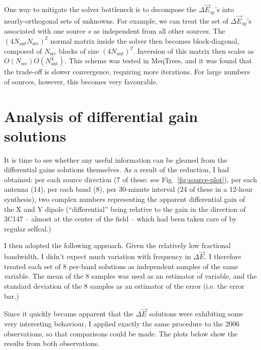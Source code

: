 \documentclass[]{aa}
\newcommand{\jones}[2]{\vec {#1}_{#2}}
\begin{document}
One way to mitigate the solver bottleneck is to decompose the $\Delta\jones{E}{sp}$'s into nearly-orthogonal sets of unknowns. For example, we can treat the set of $\Delta\jones{E}{sp}$'s associated with one source $s$ as independent from all other sources. The $(4N_\mathrm{ant}N_\mathrm{src})^2$ normal matrix inside the solver then becomes block-diagonal, composed of $N_\mathrm{src}$ blocks of size $(4N_\mathrm{ant})^2$. Inversion of this matrix then scales as $O(N_\mathrm{src})O(N_\mathrm{ant}^3)$. This scheme was tested in MeqTrees, and it was found that the trade-off is slower convergence, requiring more iterations. For large numbers of sources, however, this becomes very favourable.

\section{Analysis of differential gain solutions\label{sec:de-analysis}}

It is time to see whether any useful information can be gleaned from the differential gains solutions themselves. As a result of the reduction, I had obtained: per each source direction (7 of these: see Fig.~\ref{fig:source-plot}), per each antenna (14), per each band (8), per 30-minute interval (24 of these in a 12-hour synthesis), two complex numbers representing the apparent differential gain of the X and Y dipole (``differential'' being relative to the gain in the direction of 3C147 -- almost at the center of the field -- which had been taken care of by regular selfcal.)

I then adopted the following approach. Given the relatively low fractional bandwidth, I didn't expect much variation with frequency in $\Delta\jones{E}{}$. I therefore treated each set of 8 per-band solutions as independent samples of the same variable. The mean of the 8 samples was used as an estimator of variable, and the standard deviation of the 8 samples as an estimator of the error (i.e. the error bar.)

Since it quickly became apparent that the $\Delta\jones{E}{}$ solutions were exhibiting some very interesting behaviour, I applied exactly the same procedure to the 2006 observations, so that comparisons could be made. The plots below show the results from both observations. 
\end{document}
